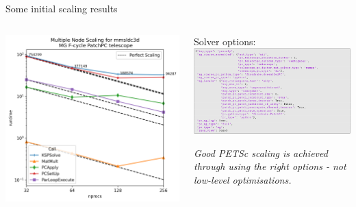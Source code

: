 \documentclass[pdf,aspectratio=169]{beamer}
\begin{document}
\begin{frame}[fragile]{Some initial scaling results}
  \begin{columns}[T]
    \begin{column}[T]{0.4\textwidth}
      \includegraphics[width=\textwidth]{main_stage}
    \end{column}
    \begin{column}[T]{0.45\textwidth}
      \small{Solver options:}
      \includegraphics[width=\textwidth]{solver_opts}

      \textit{\small Good PETSc scaling is achieved through using the right options - not low-level optimisations.}
    \end{column}
  \end{columns}
\end{frame}
\end{document}
